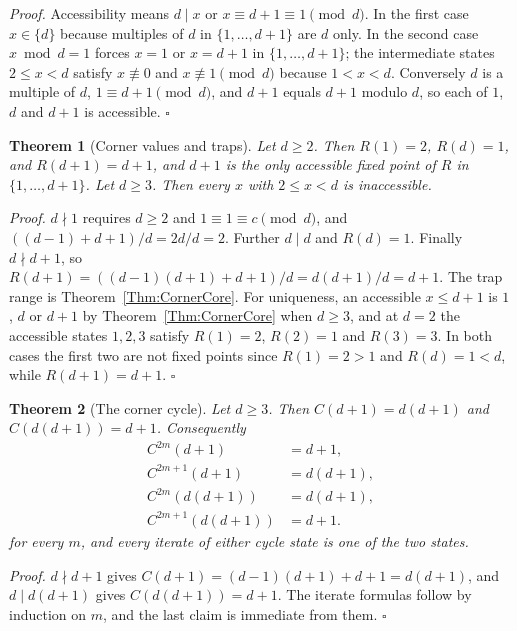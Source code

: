 \documentclass[11pt,letterpaper]{article}
\newtheorem{theorem}{Theorem}
\newenvironment{proof}{\noindent\textit{Proof.}}{\hfill\(\square\)}
\begin{document}
\begin{proof}
Accessibility means \(d\mid x\) or \(x\equiv d+1\equiv1\pmod d\). In the first
case \(x\in\{d\}\) because multiples of \(d\) in \(\{1,\dots,d+1\}\) are \(d\)
only. In the second case \(x\bmod d=1\) forces \(x=1\) or \(x=d+1\) in
\(\{1,\dots,d+1\}\); the intermediate states \(2\le x<d\) satisfy
\(x\not\equiv0\) and \(x\not\equiv1\pmod d\) because \(1<x<d\). Conversely \(d\) is
a multiple of \(d\), \(1\equiv d+1\pmod d\), and \(d+1\) equals \(d+1\) modulo
\(d\), so each of \(1\), \(d\) and \(d+1\) is accessible.
\end{proof}

\begin{theorem}[Corner values and traps]\label{Thm:CornerValues}
Let \(d\ge2\). Then \(R(1)=2\), \(R(d)=1\), and \(R(d+1)=d+1\), and
\(d+1\) is the only accessible fixed point of \(R\) in
\(\{1,\dots,d+1\}\). Let \(d\ge3\). Then every \(x\) with \(2\le x<d\)
is inaccessible.
\end{theorem}

\begin{proof}
\(d\nmid1\) requires \(d\ge2\) and \(1\equiv1\equiv c\pmod d\), and
\(((d-1)+d+1)/d=2d/d=2\). Further \(d\mid d\) and \(R(d)=1\). Finally
\(d\nmid d+1\), so
\(R(d+1)=((d-1)(d+1)+d+1)/d=d(d+1)/d=d+1\). The trap range is
Theorem~\ref{Thm:CornerCore}. For uniqueness, an accessible \(x\le d+1\) is
\(1\), \(d\) or \(d+1\) by Theorem~\ref{Thm:CornerCore} when \(d\ge3\), and
at \(d=2\) the accessible states \(1,2,3\) satisfy \(R(1)=2\), \(R(2)=1\) and
\(R(3)=3\). In both cases the first two are not fixed points since \(R(1)=2>1\)
and \(R(d)=1<d\), while \(R(d+1)=d+1\).
\end{proof}

\begin{theorem}[The corner cycle]\label{Thm:CornerCycle}
Let \(d\ge3\). Then \(C(d+1)=d(d+1)\) and \(C(d(d+1))=d+1\). Consequently
\[
\begin{aligned}
 C^{2m}(d+1) &= d+1,\\
 C^{2m+1}(d+1) &= d(d+1),\\
 C^{2m}(d(d+1)) &= d(d+1),\\
 C^{2m+1}(d(d+1)) &= d+1.
\end{aligned}
\]
for every \(m\), and every iterate of either cycle state is one of the two
states.
\end{theorem}

\begin{proof}
\(d\nmid d+1\) gives \(C(d+1)=(d-1)(d+1)+d+1=d(d+1)\), and
\(d\mid d(d+1)\) gives \(C(d(d+1))=d+1\). The iterate formulas follow by
induction on \(m\), and the last claim is immediate from them.
\end{proof}
\end{document}
